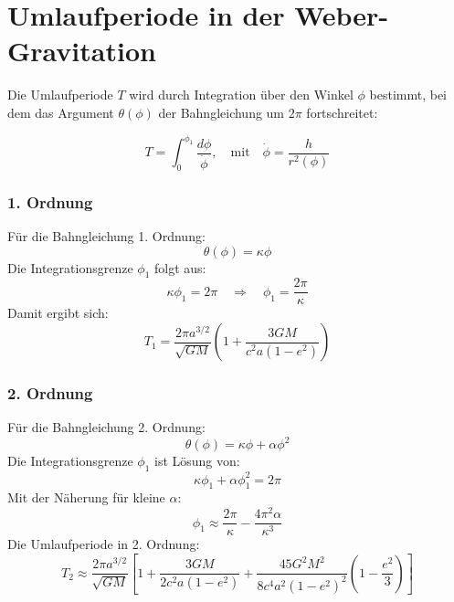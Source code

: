 \newpage
\section{Umlaufperiode in der Weber-Gravitation}
Die Umlaufperiode $T$ wird durch Integration über den Winkel $\phi$ bestimmt, bei dem das Argument $\theta(\phi)$ der Bahngleichung um $2\pi$ fortschreitet:

\begin{equation}
T = \int_{0}^{\phi_1} \frac{d\phi}{\dot{\phi}},
\quad \text{mit} \quad \dot{\phi} = \frac{h}{r^2(\phi)}
\end{equation}

\subsubsection{1. Ordnung}
Für die Bahngleichung 1. Ordnung:
\begin{equation}
\theta(\phi) = \kappa\phi
\end{equation}
Die Integrationsgrenze $\phi_1$ folgt aus:
\begin{equation}
\kappa\phi_1 = 2\pi \quad \Rightarrow \quad \phi_1 = \frac{2\pi}{\kappa}
\end{equation}
Damit ergibt sich:
\begin{equation}
T_1 = \frac{2\pi a^{3/2}}{\sqrt{GM}} \left(1 + \frac{3GM}{c^2a(1-e^2)}\right)
\end{equation}

\subsubsection{2. Ordnung}
Für die Bahngleichung 2. Ordnung:
\begin{equation}
\theta(\phi) = \kappa\phi + \alpha\phi^2
\end{equation}
Die Integrationsgrenze $\phi_1$ ist Lösung von:
\begin{equation}
\kappa\phi_1 + \alpha\phi_1^2 = 2\pi
\end{equation}
Mit der Näherung für kleine $\alpha$:
\begin{equation}
\phi_1 \approx \frac{2\pi}{\kappa} - \frac{4\pi^2\alpha}{\kappa^3}
\end{equation}
Die Umlaufperiode in 2. Ordnung:
\begin{equation}
T_2 \approx \frac{2\pi a^{3/2}}{\sqrt{GM}} \left[1 + \frac{3GM}{2c^2a(1-e^2)} + \frac{45G^2M^2}{8c^4a^2(1-e^2)^2}\left(1-\frac{e^2}{3}\right)\right]
\end{equation}

